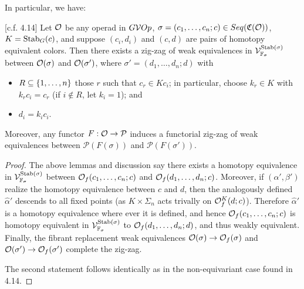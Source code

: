 \documentclass[psamsfonts,onesided,10pt,letterpaper]{amsart}%
\renewcommand{\C}{\ensuremath{\mathfrak{C}}}
\renewcommand{\P}{\ensuremath{\mathcal{P}}}
\newcommand{\Vsigma}{\ensuremath{\V^{\Stab(\sigma)}_{\F_\sigma}}}
\begin{document}
In particular, we have:
\begin{proposition}
  \label{CAV_4.14_PROP}
  [c.f. \cite{Cav14} 4.14]
  Let $\mathcal{O}$ be any operad in $G\mathcal V Op$, $\sigma = (c_1,\ldots,c_n;c)\in Seq(\C(\O))$, $K = \mathrm{Stab}_G(c)$, and suppose $(c_i,d_i)$ and $(c,d)$ are pairs of homotopy equivalent colors. Then there exists a zig-zag of weak equivalences in $\Vsigma$ between $\mathcal{O}(\sigma)$ and $\mathcal{O}(\sigma')$, where $\sigma' = (d_1,\ldots, d_n;d)$ with
  \begin{itemize}
  \item $R\subseteq \left\{1,\ldots,n\right\}$ those $r$ such that $c_r\in Kc_i$; in particular, choose $k_r\in K$ with $k_r c_i = c_r$ (if $i\not\in R$, let $k_i = 1$); and
  \item $d_i = k_i c_i$.
  \end{itemize}
Moreover, any functor $F:\O\to \P$ induces a functorial zig-zag of weak equivalences between $\P(F(\sigma))$ and $\P(F(\sigma'))$.
\end{proposition}
\begin{proof}
  The above lemmas and discussion say there exists a homotopy equivalence in $\Vsigma$ between $\mathcal{O}_f(c_1,\ldots, c_n;c)$ and $\mathcal{O}_f(d_1,\ldots, d_n;c)$. Moreover, if $(\alpha',\beta')$ realize the homotopy equivalence between $c$ and $d$, then the analogously defined $\hat\alpha'$ descends to all fixed points (as $K\times\Sigma_n$ acts trivally on $\mathcal{O}_f^K(d;c)$). Therefore $\hat\alpha'$ is a homotopy equivalence where ever it is defined, and hence $\mathcal{O}_f(c_1,\ldots, c_n;c)$ is homotopy equivalent in $\Vsigma$ to $\mathcal{O}_f(d_1,\ldots, d_n;d)$, and thus weakly equivalent. Finally, the fibrant replacement weak equivalences $\mathcal{O}(\sigma)\to\mathcal{O}_f(\sigma)$ and $\mathcal{O}(\sigma')\to \mathcal{O}_f(\sigma')$ complete the zig-zag.

The second statement follows identically as in the non-equivariant case found in \cite{Cav14} 4.14.
\end{proof}
\end{document}
